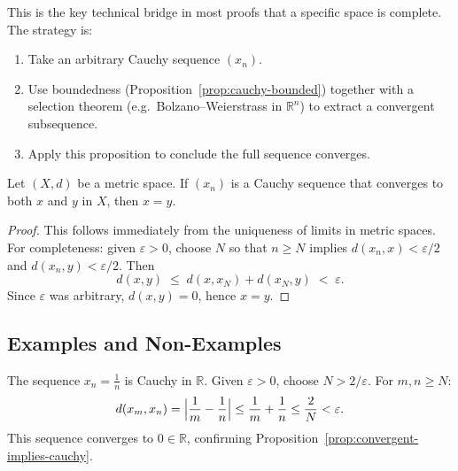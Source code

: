 \begin{remark*}
This is the key technical bridge in most proofs that a specific space
is complete.
The strategy is:
\begin{enumerate}[label=(\arabic*), leftmargin=2em]
  \item Take an arbitrary Cauchy sequence $(x_n)$.
  \item Use boundedness (Proposition~\ref{prop:cauchy-bounded}) together
        with a selection theorem (e.g.\ Bolzano--Weierstrass in
        $\mathbb{R}^n$) to extract a convergent subsequence.
  \item Apply this proposition to conclude the full sequence converges.
\end{enumerate}
\end{remark*}

\begin{proposition}
\label{prop:cauchy-unique-limit}
Let $(X,d)$ be a metric space.
If $(x_n)$ is a Cauchy sequence that converges to both $x$ and $y$ in $X$,
then $x = y$.
\end{proposition}

\begin{proof}
This follows immediately from the uniqueness of limits in metric spaces.
For completeness: given $\varepsilon > 0$, choose $N$ so that
$n \ge N$ implies $d(x_n,x) < \varepsilon/2$ and $d(x_n,y) < \varepsilon/2$.
Then
\[
  d(x,y) \;\le\; d(x, x_N) + d(x_N, y) \;<\; \varepsilon.
\]
Since $\varepsilon$ was arbitrary, $d(x,y) = 0$, hence $x = y$.
\end{proof}

\subsection{Examples and Non-Examples}
\label{sec:cauchy-examples}

\begin{example}
The sequence $x_n = \frac{1}{n}$ is Cauchy in $\mathbb{R}$.
Given $\varepsilon > 0$, choose $N > 2/\varepsilon$.
For $m, n \ge N$:
\[
  d(x_m, x_n)
  = \Bigl|\frac{1}{m} - \frac{1}{n}\Bigr|
  \le \frac{1}{m} + \frac{1}{n}
  \le \frac{2}{N}
  < \varepsilon.
\]
This sequence converges to $0 \in \mathbb{R}$, confirming
Proposition~\ref{prop:convergent-implies-cauchy}.
\end{example}

